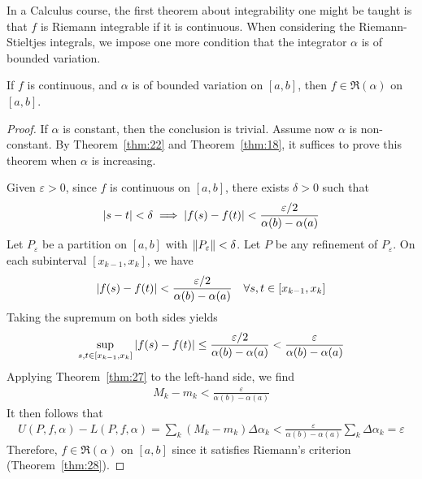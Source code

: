\documentclass[thmcnt=section, 12pt]{my-elegantbook}
\begin{document}
In a Calculus course, 
the first theorem about integrability one might be taught is 
that $ f $ is Riemann integrable if it is continuous.
When considering the Riemann-Stieltjes integrals,
we impose one more condition that the integrator
$ \alpha $ is of bounded variation.

\begin{theorem} \label{thm:75}
	If $f$ is continuous, 
	and $\alpha$ is of bounded variation on $[a, b]$,
	then $f \in \mathfrak{R}(\alpha)$ on $[a, b]$.
\end{theorem}

\begin{proof}
	If $\alpha$ is constant, then the conclusion is trivial.
	Assume now $ \alpha $ is non-constant.
	By Theorem~\ref{thm:22} and Theorem~\ref{thm:18}, 
	it suffices to prove this theorem when $ \alpha $ is increasing.
	
	Given $ \varepsilon > 0 $,
	since $ f $ is continuous on $ [a, b] $,
	there exists $ \delta > 0 $ such that 
	\begin{align*}
		\left\lvert s - t \right\rvert < \delta
		\implies \left\lvert f(s) - f(t) \right\rvert < \frac{ \varepsilon / 2 }{
			\alpha(b) - \alpha(a)
		}
	\end{align*}
	Let $ P_{ \varepsilon } $ be a partition on $ [a, b] $ with 
	$ \left\lVert P_\varepsilon \right\rVert < \delta $.
	Let $ P $ be any refinement of $ P_\varepsilon $.
	On each subinterval $ [x_{k-1}, x_k] $, we have 
	\begin{align*}
		\left\lvert f(s) - f(t) \right\rvert < \frac{ \varepsilon / 2 }{ 
			\alpha(b) - \alpha(a) 
		}
		\quad \forall s, t \in [x_{k-1}, x_k]
	\end{align*}
	Taking the supremum on both sides yields
	\begin{align*}
		\sup_{s,t \in [x_{k-1}, x_k]} \left\lvert f(s) - f(t) \right\rvert
		\leq \frac{ \varepsilon / 2 }{ 
			\alpha(b) - \alpha(a) 
		} < \frac{ \varepsilon }{ 
			\alpha(b) - \alpha(a) 
		}
	\end{align*}
	Applying Theorem~\ref{thm:27} to the left-hand side, we find 
	\begin{align*}
		M_k - m_k < \frac{ \varepsilon }{ 
			\alpha(b) - \alpha(a) 
		}
	\end{align*}
	It then follows that 
	\begin{align*}
		U(P,f, \alpha) - L(P,f, \alpha)
		= \sum_{k} (M_k - m_k) \Delta \alpha_k
		< \frac{ \varepsilon }{ \alpha(b) - \alpha(a) }
			\sum_{k} \Delta \alpha_k
		= \varepsilon
	\end{align*}
	Therefore, $ f \in \mathfrak{R}(\alpha) $ on $ [a, b] $
	since it satisfies Riemann's criterion (Theorem~\ref{thm:28}).
\end{proof}
\end{document}
